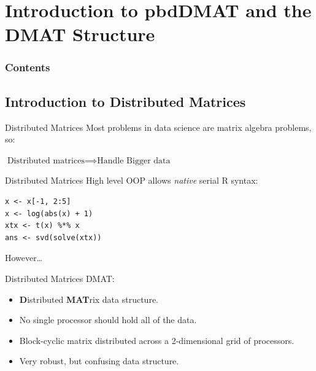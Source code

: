 \section[DMAT]{Introduction to pbdDMAT and the DMAT Structure}

\hidenum
\begin{frame}[noframenumbering]
\frametitle{Contents}
 \tableofcontents[currentsection,hideothersubsections,sectionstyle=show/hide]
\end{frame}
\shownum

\subsection{Introduction to Distributed Matrices}

\begin{frame}
  \begin{block}{Distributed Matrices}\pause
  Most problems in data science are matrix algebra problems, so:
  \begin{center}
  $\text{Distributed matrices} \implies \text{Handle Bigger data}$
  \end{center}
  \end{block}
\end{frame}


\begin{frame}[fragile]
  \begin{block}{Distributed Matrices}\pause
  High level OOP allows \emph{native} serial R syntax:
  \begin{lstlisting}
x <- x[-1, 2:5]
x <- log(abs(x) + 1)
xtx <- t(x) %*% x
ans <- svd(solve(xtx))
  \end{lstlisting}
  \vspace{.4cm}
  However\dots
  \end{block}
\end{frame}


\begin{frame}
  \begin{block}{Distributed Matrices}\pause
  DMAT:
    \begin{itemize}
     \item \textbf{D}istributed \textbf{MAT}rix data structure.
     \item No single processor should hold all of the data.
     \item Block-cyclic matrix distributed across a 2-dimensional grid of processors.
     \item Very robust, but confusing data structure.
    \end{itemize}
  \end{block}
\end{frame}



